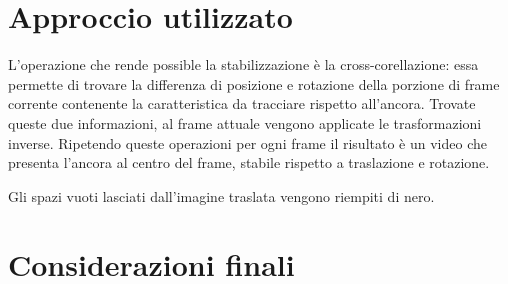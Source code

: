 \documentclass[12pt]{article}
\begin{document}
\section{Approccio utilizzato}
L'operazione che rende possible la stabilizzazione è la cross-corellazione: essa permette di trovare la differenza di posizione e rotazione della porzione di frame corrente contenente la caratteristica da tracciare rispetto all'ancora. Trovate queste due informazioni, al frame attuale vengono applicate le trasformazioni inverse. Ripetendo queste operazioni per ogni frame il risultato è un video che presenta l'ancora al centro del frame, stabile rispetto a traslazione e rotazione.

Gli spazi vuoti lasciati dall'imagine traslata vengono riempiti di nero.

\section{Considerazioni finali}
\end{document}
